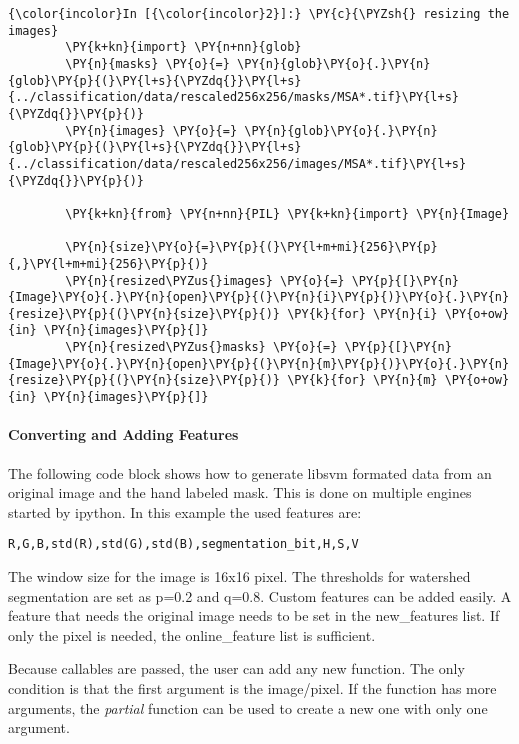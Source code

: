     \begin{Verbatim}[commandchars=\\\{\}]
{\color{incolor}In [{\color{incolor}2}]:} \PY{c}{\PYZsh{} resizing the images}
        \PY{k+kn}{import} \PY{n+nn}{glob}
        \PY{n}{masks} \PY{o}{=} \PY{n}{glob}\PY{o}{.}\PY{n}{glob}\PY{p}{(}\PY{l+s}{\PYZdq{}}\PY{l+s}{../classification/data/rescaled256x256/masks/MSA*.tif}\PY{l+s}{\PYZdq{}}\PY{p}{)}
        \PY{n}{images} \PY{o}{=} \PY{n}{glob}\PY{o}{.}\PY{n}{glob}\PY{p}{(}\PY{l+s}{\PYZdq{}}\PY{l+s}{../classification/data/rescaled256x256/images/MSA*.tif}\PY{l+s}{\PYZdq{}}\PY{p}{)}
        
        \PY{k+kn}{from} \PY{n+nn}{PIL} \PY{k+kn}{import} \PY{n}{Image}
        
        \PY{n}{size}\PY{o}{=}\PY{p}{(}\PY{l+m+mi}{256}\PY{p}{,}\PY{l+m+mi}{256}\PY{p}{)}
        \PY{n}{resized\PYZus{}images} \PY{o}{=} \PY{p}{[}\PY{n}{Image}\PY{o}{.}\PY{n}{open}\PY{p}{(}\PY{n}{i}\PY{p}{)}\PY{o}{.}\PY{n}{resize}\PY{p}{(}\PY{n}{size}\PY{p}{)} \PY{k}{for} \PY{n}{i} \PY{o+ow}{in} \PY{n}{images}\PY{p}{]}
        \PY{n}{resized\PYZus{}masks} \PY{o}{=} \PY{p}{[}\PY{n}{Image}\PY{o}{.}\PY{n}{open}\PY{p}{(}\PY{n}{m}\PY{p}{)}\PY{o}{.}\PY{n}{resize}\PY{p}{(}\PY{n}{size}\PY{p}{)} \PY{k}{for} \PY{n}{m} \PY{o+ow}{in} \PY{n}{images}\PY{p}{]}
\end{Verbatim}


    \paragraph{Converting and Adding Features}


    The following code block shows how to generate libsvm formated data from
an original image and the hand labeled mask. This is done on multiple
engines started by ipython. In this example the used features are:

\begin{verbatim}
R,G,B,std(R),std(G),std(B),segmentation_bit,H,S,V
\end{verbatim}

The window size for the image is 16x16 pixel. The thresholds for
watershed segmentation are set as p=0.2 and q=0.8. Custom features can
be added easily. A feature that needs the original image needs to be set
in the new\_features list. If only the pixel is needed, the
online\_feature list is sufficient.

Because callables are passed, the user can add any new function. The
only condition is that the first argument is the image/pixel. If the
function has more arguments, the \emph{partial} function can be used to
create a new one with only one argument.

